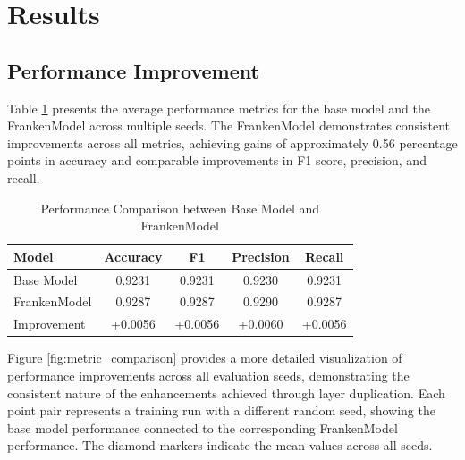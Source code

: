 \documentclass[conference]{IEEEtran}
\begin{document}
\section{Results}

\subsection{Performance Improvement}
Table \ref{tab:performance} presents the average performance metrics for the base model and the FrankenModel across multiple seeds. The FrankenModel demonstrates consistent improvements across all metrics, achieving gains of approximately 0.56 percentage points in accuracy and comparable improvements in F1 score, precision, and recall.

\begin{table}[!t]
\caption{Performance Comparison between Base Model and FrankenModel}
\label{tab:performance}
\centering
\begin{tabular}{lcccc}
\toprule
\textbf{Model} & \textbf{Accuracy} & \textbf{F1} & \textbf{Precision} & \textbf{Recall} \\
\midrule
Base Model & 0.9231 & 0.9231 & 0.9230 & 0.9231 \\
FrankenModel & 0.9287 & 0.9287 & 0.9290 & 0.9287 \\
\midrule
Improvement & +0.0056 & +0.0056 & +0.0060 & +0.0056 \\
\bottomrule
\end{tabular}
\end{table}

Figure \ref{fig:metric_comparison} provides a more detailed visualization of performance improvements across all evaluation seeds, demonstrating the consistent nature of the enhancements achieved through layer duplication. Each point pair represents a training run with a different random seed, showing the base model performance connected to the corresponding FrankenModel performance. The diamond markers indicate the mean values across all seeds.
\end{document}

